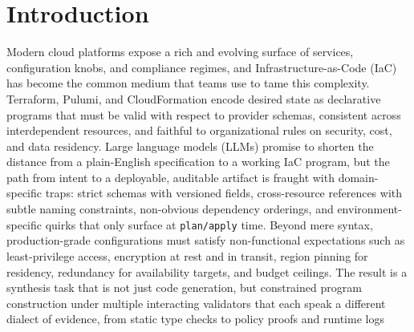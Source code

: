 \documentclass[acmsmall,screen,review,anonymous]{acmart}
\begin{document}

\maketitle




\section{Introduction}

Modern cloud platforms expose a rich and evolving surface of services, configuration knobs, and compliance regimes, and Infrastructure-as-Code (IaC) \cite{rahman2019systematic} has become the common medium that teams use to tame this complexity. Terraform, Pulumi, and CloudFormation encode desired state as declarative programs that must be valid with respect to provider schemas, consistent across interdependent resources, and faithful to organizational rules on security, cost, and data residency. Large language models (LLMs) \cite{chang2024survey} promise to shorten the distance from a plain-English specification to a working IaC program, but the path from intent to a deployable, auditable artifact is fraught with domain-specific traps: strict schemas with versioned fields, cross-resource references with subtle naming constraints, non-obvious dependency orderings, and environment-specific quirks that only surface at \texttt{plan/apply} time. Beyond mere syntax, production-grade configurations must satisfy non-functional expectations such as least-privilege access, encryption at rest and in transit, region pinning for residency, redundancy for availability targets, and budget ceilings. The result is a synthesis task that is not just code generation, but constrained program construction under multiple interacting validators that each speak a different dialect of evidence, from static type checks to policy proofs and runtime logs
\end{document}
